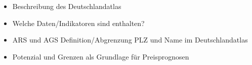 \begin{itemize}
    \item Beschreibung des Deutschlandatlas
    \item Welche Daten/Indikatoren sind enthalten?
    \item ARS und AGS Definition/Abgrenzung PLZ und Name im Deutschlandatlas
    \item Potenzial und Grenzen als Grundlage für Preisprognosen
\end{itemize}